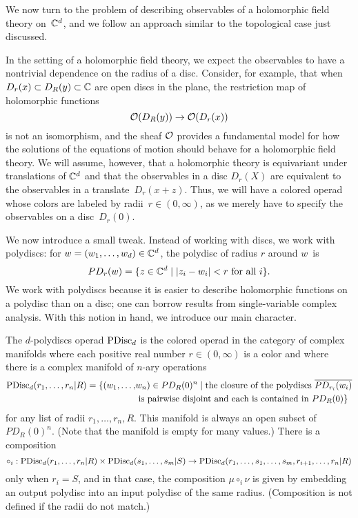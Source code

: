 \documentclass[11pt]{amsart}
\begin{document}
We now turn to the problem of describing observables of a holomorphic field theory on~$\mathbb C^d$,
and we follow an approach similar to the topological case just discussed.

In the setting of a holomorphic field theory, we expect the observables to have a nontrivial dependence on the radius of a disc.
Consider, for example, that 
when $D_r(x) \subset D_R(y) \subset \mathbb C$ are open discs in the plane,
the restriction map of holomorphic functions
\[
\mathcal O(D_R(y))\to \mathcal O(D_r(x))
\]
is not an isomorphism,
and the sheaf $\mathcal O$ provides a fundamental model for how the solutions of the equations of motion should behave for a holomorphic field theory.
We will assume, however, that a holomorphic theory is equivariant under translations of $\mathbb C^d$ and that the observables in a disc $D_r(X)$ are equivalent to the observables in a translate~$D_r(x+z)$.
Thus, we will have a colored operad whose colors are labeled by radii~$r \in (0,\infty)$,
as we merely have to specify the observables on a disc~$D_r(0)$.

We now introduce a small tweak.
Instead of working with discs, we work with polydiscs: for $w = (w_1, \ldots, w_d) \in \mathbb C^d$, the polydisc of radius $r$ around $w$~is
\[
PD_r(w) = \{ z \in \mathbb C^d \;|\; |z_i - w_i| < r \text{ for all $i$}\}.
\]
We work with polydiscs because it is easier to describe holomorphic functions on a polydisc than on a disc;
one can borrow results from single-variable complex analysis.
With this notion in hand, we introduce our main character.

\begin{dfn}
The {$d$-polydiscs operad} ${\rm PDisc}_d$ is the colored operad in the category of complex manifolds where each positive real number $r \in (0,\infty)$ is a color 
and where there is a complex manifold of $n$-ary operations
\begin{align*}
{\rm PDisc}_d(r_1, \ldots, r_n| R) = \{ (w_1, \ldots,& w_n) \in PD_R(0)^n \;|\; 
\text{the closure of the polydiscs $\overline{PD_{r_i}(w_i)}$}\\ 
&\text{ is pairwise disjoint and each is contained in $PD_R(0)$}\}
\end{align*}
for any list of radii $r_1,\ldots, r_n, R$.
This manifold is always an open subset of~$PD_R(0)^n$. 
(Note that the manifold is empty for many values.)
There is a composition
\[
\circ_i: {\rm PDisc}_d(r_1, \ldots, r_n| R) \times {\rm PDisc}_d(s_1, \ldots, s_m| S) \to {\rm PDisc}_d(r_1, \ldots, s_1, \ldots, s_m, r_{i+1}, \ldots, r_n| R)
\]
only when $r_i = S$, 
and in that case, the composition $\mu \circ_i \nu$ is given by embedding an output polydisc into an input polydisc of the same radius.
(Composition is not defined if the radii do not match.)
\end{dfn}
\end{document}
